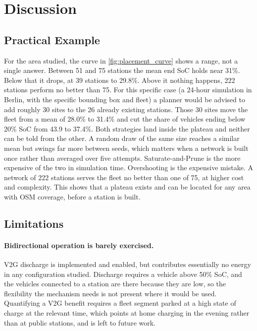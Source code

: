\section{Discussion}
\label{sec:discussion}

\subsection{Practical Example}

For the area studied, the curve in \cref{fig:placement_curve} shows a range, not a single answer. Between 51 and 75 stations the mean end \ac{SoC} holds near 31\%. Below that it drops, at 39 stations to 29.8\%. Above it nothing happens, 222 stations perform no better than 75. For this specific case (a 24-hour simulation in Berlin, with the specific bounding box and fleet) a planner would be advised to add roughly 30 sites to the 26 already existing stations. Those 30 sites move the fleet from a mean of 28.0\% to 31.4\% and cut the share of vehicles ending below 20\% \ac{SoC} from 43.9 to 37.4\%. Both strategies land inside the plateau and neither can be told from the other. A random draw of the same size reaches a similar mean but swings far more between seeds, which matters when a network is built once rather than averaged over five attempts. Saturate-and-Prune is the more expensive of the two in simulation time. Overshooting is the expensive mistake. A network of 222 stations serves the fleet no better than one of 75, at higher cost and complexity. This shows that a plateau exists and can be located for any area with \ac{OSM} coverage, before a station is built.

\subsection{Limitations}

\paragraph{Bidirectional operation is barely exercised.} \ac{V2G} discharge is implemented and enabled, but contributes essentially no energy in any configuration studied. Discharge requires a vehicle above 50\% \ac{SoC}, and the vehicles connected to a station are there because they are low, so the flexibility the mechanism needs is not present where it would be used. Quantifying a \ac{V2G} benefit requires a fleet segment parked at a high state of charge at the relevant time, which points at home charging in the evening rather than at public stations, and is left to future work.

